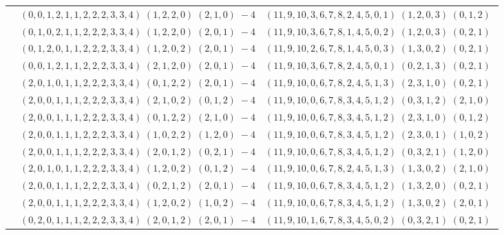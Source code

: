 \documentclass[11pt]{article}
\begin{document}
\begin{longtable}[l]{|c|c|c|}
 \cline{2-3} 
 & $(0 ,0 ,1 ,2 ,1 ,1 ,2 ,2 ,2 ,3 ,3 ,4) \;(1 ,2 ,2 ,0) \;(2 ,1 ,0) \;-4$ & $(11 ,9 ,10 ,3 ,6 ,7 ,8 ,2 ,4 ,5 ,0 ,1) \;(1 ,2 ,0 ,3) \;(0 ,1 ,2) \;$\\ 
 \cline{2-3} 
 & $(0 ,1 ,0 ,2 ,1 ,1 ,2 ,2 ,2 ,3 ,3 ,4) \;(1 ,2 ,2 ,0) \;(2 ,0 ,1) \;-4$ & $(11 ,9 ,10 ,3 ,6 ,7 ,8 ,1 ,4 ,5 ,0 ,2) \;(1 ,2 ,0 ,3) \;(0 ,2 ,1) \;$\\ 
 \cline{2-3} 
 & $(0 ,1 ,2 ,0 ,1 ,1 ,2 ,2 ,2 ,3 ,3 ,4) \;(1 ,2 ,0 ,2) \;(2 ,0 ,1) \;-4$ & $(11 ,9 ,10 ,2 ,6 ,7 ,8 ,1 ,4 ,5 ,0 ,3) \;(1 ,3 ,0 ,2) \;(0 ,2 ,1) \;$\\ 
 \cline{2-3} 
 & $(0 ,0 ,1 ,2 ,1 ,1 ,2 ,2 ,2 ,3 ,3 ,4) \;(2 ,1 ,2 ,0) \;(2 ,0 ,1) \;-4$ & $(11 ,9 ,10 ,3 ,6 ,7 ,8 ,2 ,4 ,5 ,0 ,1) \;(0 ,2 ,1 ,3) \;(0 ,2 ,1) \;$\\ 
 \cline{2-3} 
 & $(2 ,0 ,1 ,0 ,1 ,1 ,2 ,2 ,2 ,3 ,3 ,4) \;(0 ,1 ,2 ,2) \;(2 ,0 ,1) \;-4$ & $(11 ,9 ,10 ,0 ,6 ,7 ,8 ,2 ,4 ,5 ,1 ,3) \;(2 ,3 ,1 ,0) \;(0 ,2 ,1) \;$\\ 
 \cline{2-3} 
 & $(2 ,0 ,0 ,1 ,1 ,1 ,2 ,2 ,2 ,3 ,3 ,4) \;(2 ,1 ,0 ,2) \;(0 ,1 ,2) \;-4$ & $(11 ,9 ,10 ,0 ,6 ,7 ,8 ,3 ,4 ,5 ,1 ,2) \;(0 ,3 ,1 ,2) \;(2 ,1 ,0) \;$\\ 
 \cline{2-3} 
 & $(2 ,0 ,0 ,1 ,1 ,1 ,2 ,2 ,2 ,3 ,3 ,4) \;(0 ,1 ,2 ,2) \;(2 ,1 ,0) \;-4$ & $(11 ,9 ,10 ,0 ,6 ,7 ,8 ,3 ,4 ,5 ,1 ,2) \;(2 ,3 ,1 ,0) \;(0 ,1 ,2) \;$\\ 
 \cline{2-3} 
 & $(2 ,0 ,0 ,1 ,1 ,1 ,2 ,2 ,2 ,3 ,3 ,4) \;(1 ,0 ,2 ,2) \;(1 ,2 ,0) \;-4$ & $(11 ,9 ,10 ,0 ,6 ,7 ,8 ,3 ,4 ,5 ,1 ,2) \;(2 ,3 ,0 ,1) \;(1 ,0 ,2) \;$\\ 
 \cline{2-3} 
 & $(2 ,0 ,0 ,1 ,1 ,1 ,2 ,2 ,2 ,3 ,3 ,4) \;(2 ,0 ,1 ,2) \;(0 ,2 ,1) \;-4$ & $(11 ,9 ,10 ,0 ,6 ,7 ,8 ,3 ,4 ,5 ,1 ,2) \;(0 ,3 ,2 ,1) \;(1 ,2 ,0) \;$\\ 
 \cline{2-3} 
 & $(2 ,0 ,1 ,0 ,1 ,1 ,2 ,2 ,2 ,3 ,3 ,4) \;(1 ,2 ,0 ,2) \;(0 ,1 ,2) \;-4$ & $(11 ,9 ,10 ,0 ,6 ,7 ,8 ,2 ,4 ,5 ,1 ,3) \;(1 ,3 ,0 ,2) \;(2 ,1 ,0) \;$\\ 
 \cline{2-3} 
 & $(2 ,0 ,0 ,1 ,1 ,1 ,2 ,2 ,2 ,3 ,3 ,4) \;(0 ,2 ,1 ,2) \;(2 ,0 ,1) \;-4$ & $(11 ,9 ,10 ,0 ,6 ,7 ,8 ,3 ,4 ,5 ,1 ,2) \;(1 ,3 ,2 ,0) \;(0 ,2 ,1) \;$\\ 
 \cline{2-3} 
 & $(2 ,0 ,0 ,1 ,1 ,1 ,2 ,2 ,2 ,3 ,3 ,4) \;(1 ,2 ,0 ,2) \;(1 ,0 ,2) \;-4$ & $(11 ,9 ,10 ,0 ,6 ,7 ,8 ,3 ,4 ,5 ,1 ,2) \;(1 ,3 ,0 ,2) \;(2 ,0 ,1) \;$\\ 
 \cline{2-3} 
 & $(0 ,2 ,0 ,1 ,1 ,1 ,2 ,2 ,2 ,3 ,3 ,4) \;(2 ,0 ,1 ,2) \;(2 ,0 ,1) \;-4$ & $(11 ,9 ,10 ,1 ,6 ,7 ,8 ,3 ,4 ,5 ,0 ,2) \;(0 ,3 ,2 ,1) \;(0 ,2 ,1) \;$\\ 

\end{longtable}
\end{document}
